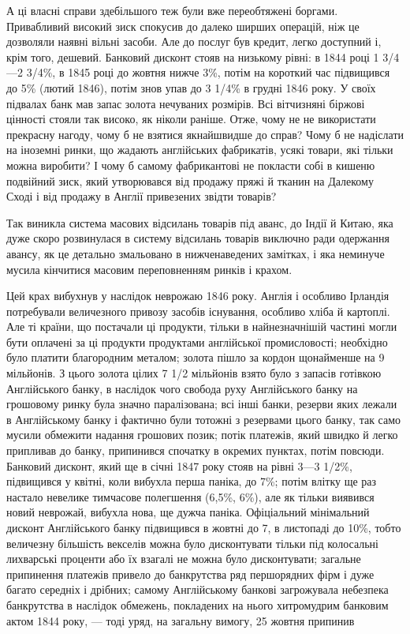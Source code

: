 А ці власні справи здебільшого теж були вже переобтяжені боргами. Привабливий високий зиск спокусив
до далеко
ширших операцій, ніж це дозволяли наявні вільні засоби. Але до
послуг був кредит, легко доступний і, крім того, дешевий. Банковий дисконт стояв на низькому рівні:
в 1844 році 1 3/4—2 3/4\%, в 1845 році до жовтня нижче 3\%, потім на короткий час підвищився до 5\%
(лютий 1846), потім знов упав до 3 1/4\% в грудні
1846 року. У своїх підвалах банк мав запас золота нечуваних
розмірів. Всі вітчизняні біржові цінності стояли так високо, як ніколи раніше. Отже, чому не не
використати прекрасну нагоду,
чому б не взятися якнайшвидше до справ? Чому б не надіслати
на іноземні ринки, що жадають англійських фабрикатів, усякі
товари, які тільки можна виробити? І чому б самому фабрикантові не покласти собі в кишеню подвійний
зиск, який утворювався від продажу пряжі й тканин на Далекому Сході і від
продажу в Англії привезених звідти товарів?

Так виникла система масових відсилань товарів під аванс, до
Індії й Китаю, яка дуже скоро розвинулася в систему відсилань
товарів виключно ради одержання авансу, як це детально змальовано в нижченаведених замітках, і яка
неминуче мусила кінчитися масовим переповненням ринків і крахом.

Цей крах вибухнув у наслідок неврожаю 1846 року. Англія
і особливо Ірландія потребували величезного привозу засобів
існування, особливо хліба й картоплі. Але ті країни, що постачали ці продукти, тільки в
найнезначнішій частині могли бути
оплачені за ці продукти продуктами англійської промисловості;
необхідно було платити благородним металом; золота пішло за
кордон щонайменше на 9 мільйонів. З цього золота цілих
7 1/2 мільйонів взято було з запасів готівкою Англійського банку,
в наслідок чого свобода руху Англійського банку на грошовому
ринку була значно паралізована; всі інші банки, резерви яких
лежали в Англійському банку і фактично були тотожні з резервами цього банку, так само мусили
обмежити надання грошових
позик; потік платежів, який швидко й легко припливав до банку,
припинився спочатку в окремих пунктах, потім повсюди. Банковий дисконт, який ще в січні 1847 року
стояв на рівні 3—3 1/2\%, підвищився у квітні, коли вибухла перша паніка, до 7\%; потім влітку
ще раз настало невелике тимчасове полегшення (6,5\%, 6\%), але
як тільки виявився новий неврожай, вибухла нова, ще дужча паніка. Офіціальний мінімальний дисконт
Англійського банку підвищився в жовтні до 7, в листопаді до 10\%, тобто величезну більшість векселів
можна було дисконтувати тільки під колосальні
лихварські проценти або їх взагалі не можна було дисконтувати;
загальне припинення платежів привело до банкрутства ряд першорядних фірм і дуже багато середніх і
дрібних; самому Англійському банкові загрожувала небезпека банкрутства в наслідок
обмежень, покладених на нього хитромудрим банковим актом
1844 року, — тоді уряд, на загальну вимогу, 25 жовтня припинив
